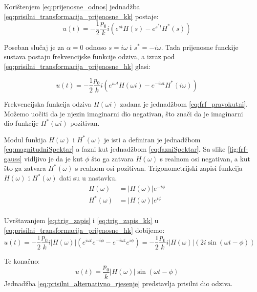 Korištenjem \eqref{eq:prijenosne_odnos} jednadžba \eqref{eq:prisilni_transformacija_prijenosne_kk}
postaje:
\begin{equation}\label{eq:prisilni_transformacija_prijenosne_hk}
    u(t)=-\frac{1}{2}\frac{p_0}{k}i (e^{st}H(s)-e^{s^*t}H^*(s))
\end{equation}

Poseban slučaj je za $\alpha = 0$ odnoso $s=i\omega \text{ i } s^*=-i\omega$. Tada
prijenosne funckije sustava postaju frekvencijske funkcije odziva, a izraz pod
\eqref{eq:prisilni_transformacija_prijenosne_hk} glasi:

\begin{equation}\label{eq:prisilni_transformacija_frf}
    u(t) = -\frac{1}{2}\frac{p_0}{k}i(e^{i\omega t}H(\omega i) - e^{-i\omega t}H^*(i\omega))
\end{equation}

Frekvencijska funkcija odziva $H(\omega i)$ zadana je jednadžbom \eqref{eq:frf_pravokutni}.
Možemo uočiti da je njezin imaginarni dio negativan, što znači da je imaginarni dio
funkcije $H^*(\omega i)$ pozitivan.

Modul funkija $H(\omega)$ i $H^*(\omega)$ je isti a definiran je jednadžbom
\eqref{eq:magnitudniSpektar} a fazni kut jednadžbom \eqref{eq:fazniSpektar}. Sa
slike \ref{fig:frf-gauss} vidljivo je da je kut $\phi$ što ga zatvara $H(\omega)$ s
realnom osi negativan, a kut što ga zatvara $H^*(\omega)$ s realnom osi pozitivan.
Trigonometrijski zapisi funkcija $H(\omega) \text{ i } H^*(\omega)$ dati su u
nastavku.
\begin{align}
    H(\omega) &= |H(\omega)|e^{-i\phi} \label{eq:trig_zapis}\\
    H^*(\omega) &= |H(\omega)|e^{i\phi} \label{eq:trik_zapis_hk}\\ %
\end{align}

Uvrštavanjem \eqref{eq:trig_zapis} i \eqref{eq:trig_zapis_kk} u \eqref{eq:prisilni_transformacija_prijenosne_hk}
dobijemo:
\begin{equation}
    u(t)=-\frac{1}{2}\frac{p_0}{k}i|H(\omega)|(e^{i\omega t}e^{-i\phi}-e^{-i\omega t}e^{i\phi})
        =-\frac{1}{2}\frac{p_0}{k}i|H(\omega)|(2i\sin(\omega t -\phi))
\end{equation}

Te konačno:
\begin{equation}\label{eq:prisilni_alternativno_rjesenje}
    u(t)=\frac{p_0}{k}|H(\omega)|\sin(\omega t - \phi)
\end{equation}
Jednadžba \eqref{eq:prisilni_alternativno_rjesenje} predstavlja prisilni dio odziva.

